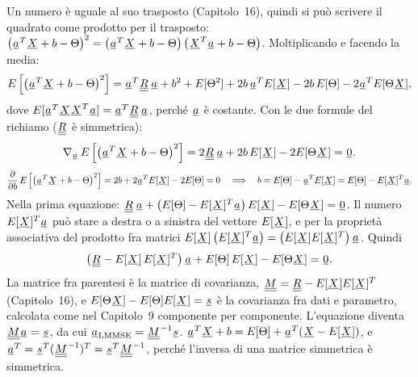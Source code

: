 \begin{dimostrazione}
 Un numero è uguale al suo trasposto (Capitolo~16), quindi si può scrivere il quadrato
come prodotto per il trasposto: $\left( \vett{a}^T \vett{X} + b - \Theta \right)^2 = \left( \vett{a}^T \vett{X} + b -
\Theta \right) \left( \vett{X}^T \vett{a} + b - \Theta \right)$. Moltiplicando e facendo la media:
\[ E\left[ \left( \vett{a}^T \vett{X} + b - \Theta \right)^2 \right] = \vett{a}^T \matr{R}\, \vett{a} + b^2 +
   E[\Theta^2] + 2b\, \vett{a}^T E[\vett{X}] - 2b\, E[\Theta] - 2\vett{a}^T E[\Theta \vett{X}] , \]
dove $E[\vett{a}^T \vett{X}\vett{X}^T \vett{a}] = \vett{a}^T \matr{R}\, \vett{a}$, perché $\vett{a}$ è costante.
 Con le due formule del richiamo ($\matr{R}$ è simmetrica):
\[ \nabla_{\vett{a}}\, E\left[ \left( \vett{a}^T \vett{X} + b - \Theta \right)^2 \right] = 2\matr{R}\, \vett{a} + 2b\,
   E[\vett{X}] - 2E[\Theta \vett{X}] = \vett{0} . \]
\[ \frac{\partial}{\partial b}\, E\left[ \left( \vett{a}^T \vett{X} + b - \Theta \right)^2 \right] = 2b + 2\vett{a}^T
   E[\vett{X}] - 2E[\Theta] = 0 \quad\Longrightarrow\quad b = E[\Theta] - \vett{a}^T E[\vett{X}] = E[\Theta] -
   E[\vett{X}]^T \vett{a} . \]
 Nella prima equazione:
$\matr{R}\, \vett{a} + \left( E[\Theta] - E[\vett{X}]^T \vett{a} \right) E[\vett{X}] - E[\Theta \vett{X}] = \vett{0}$.
Il numero $E[\vett{X}]^T \vett{a}$ può stare a destra o a sinistra del vettore $E[\vett{X}]$, e per la proprietà
associativa del prodotto fra matrici $E[\vett{X}] \left( E[\vett{X}]^T \vett{a} \right) = \left( E[\vett{X}]
E[\vett{X}]^T \right) \vett{a}$. Quindi
\[ \left( \matr{R} - E[\vett{X}]\, E[\vett{X}]^T \right) \vett{a} + E[\Theta]\, E[\vett{X}] - E[\Theta \vett{X}] =
   \vett{0} . \]
 La matrice fra parentesi è la matrice di covarianza, $\matr{M} = \matr{R} -
E[\vett{X}]E[\vett{X}]^T$ (Capitolo~16), e $E[\Theta\vett{X}] - E[\Theta] E[\vett{X}] = \vett{s}$ è la covarianza fra
dati e parametro, calcolata come nel Capitolo~9 componente per componente. L'equazione diventa $\matr{M}\vett{a} =
\vett{s}$, da cui $\vett{a}_{\text{LMMSE}} = \matr{M}^{-1}\vett{s}$.
 $\vett{a}^T \vett{X} + b = E[\Theta] + \vett{a}^T (\vett{X} - E[\vett{X}])$, e
$\vett{a}^T = \vett{s}^T (\matr{M}^{-1})^T = \vett{s}^T \matr{M}^{-1}$, perché l'inversa di una matrice simmetrica è
simmetrica.
\end{dimostrazione}


